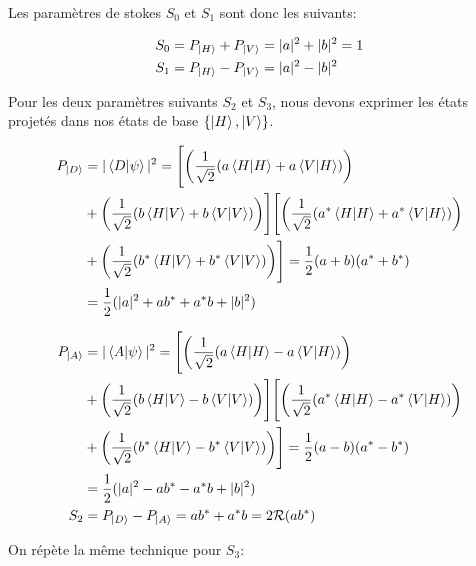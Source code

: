 \begin{onehalfspace}
    \noindent Les paramètres de stokes $S_0$ et $S_1$ sont donc les 
    suivants:

    \begin{align}
        S_0 &= P_{\ket{H}} + P_{\ket{V}} = |a|^2 + |b|^2 = 1\\
        S_1 &= P_{\ket{H}} - P_{\ket{V}} = |a|^2 - |b|^2
    \end{align}

    \noindent Pour les deux paramètres suivants $S_2$ et $S_3$, nous 
    devons exprimer les états projetés dans nos états de base 
    $\{\ket{H},\ket{V}\}$. 

    \begin{align}
        P_{\ket{D}} &= |\bra{D}\ket{\psi}|^2 = \Biggl[\biggl(\frac{1}{\sqrt{2}}(a\bra{H}\ket{H} + a\bra{V}\ket{H})\biggr)\\ 
        &+ \biggl(\frac{1}{\sqrt{2}}(b\bra{H}\ket{V} + b\bra{V}\ket{V})\biggr)\Biggr]\Biggl[ \biggl(\frac{1}{\sqrt{2}}(a^*\bra{H}\ket{H} + a^*\bra{V}\ket{H})\biggr)\\
        &+ \biggl(\frac{1}{\sqrt{2}}(b^*\bra{H}\ket{V} + b^*\bra{V}\ket{V})\biggr) \Biggr] = \frac{1}{2}(a + b)(a^* + b^*)\\
        &= \frac{1}{2}(|a|^2 + ab^* + a^*b + |b|^2)\\
    \end{align}
    
    \begin{align}  
        P_{\ket{A}} &= |\bra{A}\ket{\psi}|^2 = \Biggl[\biggl(\frac{1}{\sqrt{2}}(a\bra{H}\ket{H} - a\bra{V}\ket{H})\biggr)\\ 
        &+ \biggl(\frac{1}{\sqrt{2}}(b\bra{H}\ket{V} - b\bra{V}\ket{V})\biggr)\Biggr]\Biggl[ \biggl(\frac{1}{\sqrt{2}}(a^*\bra{H}\ket{H} - a^*\bra{V}\ket{H})\biggr)\\
        &+ \biggl(\frac{1}{\sqrt{2}}(b^*\bra{H}\ket{V} - b^*\bra{V}\ket{V})\biggr) \Biggr] = \frac{1}{2}(a - b)(a^* - b^*)\\
        &= \frac{1}{2}(|a|^2 - ab^* - a^*b + |b|^2)\\
        S_2 &= P_{\ket{D}} - P_{\ket{A}} = ab^* + a^*b = 2\mathcal{R}(ab^*)
    \end{align} 

    \noindent On répète la même technique pour $S_3$:


\end{onehalfspace}
